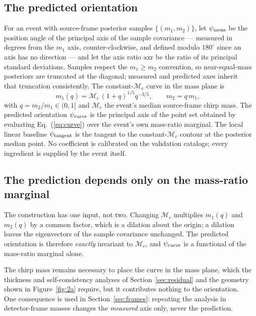 \documentclass[aps,prd,twocolumn,amsmath,amssymb,nofootinbib,superscriptaddress]{revtex4-2}
\begin{document}
\subsection{The predicted orientation}
\label{sec:definition}
For an event with source-frame posterior samples $\{(m_1,m_2)\}$, let $\psi_{\rm meas}$ be the position
angle of the principal axis of the sample covariance --- measured in degrees from the $m_1$ axis,
counter-clockwise, and defined modulo $180^\circ$ since an axis has no direction --- and let the axis
ratio $\mathrm{axr}$ be the ratio of its principal standard deviations. Samples respect the
$m_1 \ge m_2$ convention, so near-equal-mass posteriors are truncated at the diagonal; measured and
predicted axes inherit that truncation consistently. The constant-$\mathcal{M}_c$ curve in the mass plane is
\begin{equation}
m_1(q) = \mathcal{M}_c\,(1+q)^{1/5} q^{-3/5}, \qquad m_2 = q\,m_1,
\label{eq:curve}
\end{equation}
with $q = m_2/m_1 \in (0,1]$ and $\mathcal{M}_c$ the event's median source-frame chirp mass. The predicted
orientation $\psi_{\rm curve}$ is the principal axis of the point set obtained by evaluating
Eq.~(\ref{eq:curve}) over the event's own mass-ratio marginal. The local linear baseline
$\psi_{\rm tangent}$ is the tangent to the constant-$\mathcal{M}_c$ contour at the posterior median point.
No coefficient is calibrated on the validation catalogs; every ingredient is supplied by the event itself.

\subsection{The prediction depends only on the mass-ratio marginal}
\label{sec:onlyq}
The construction has one input, not two. Changing $\mathcal{M}_c$ multiplies $m_1(q)$ and $m_2(q)$ by a
common factor, which is a dilation about the origin; a dilation leaves the eigenvectors of the sample
covariance unchanged. The predicted orientation is therefore \emph{exactly} invariant to $\mathcal{M}_c$,
and $\psi_{\rm curve}$ is a functional of the mass-ratio marginal alone.

The chirp mass remains necessary to place the curve in the mass plane, which the thickness and
self-consistency analyses of Section~\ref{sec:residual} and the geometry shown in Figure~\ref{fig:2a}
require, but it contributes nothing to the orientation. One consequence is used in
Section~\ref{sec:frames}: repeating the analysis in detector-frame masses changes the \emph{measured} axis
only, never the prediction.
\end{document}
